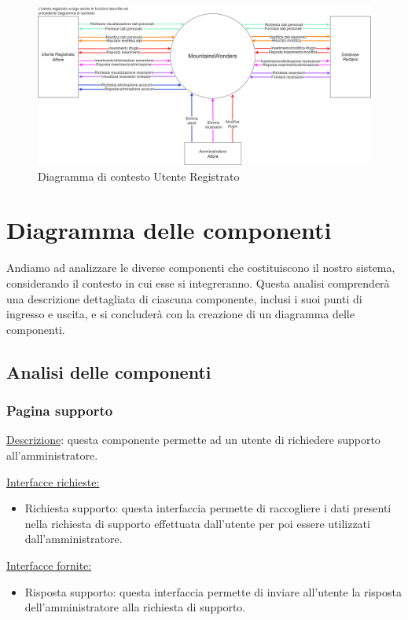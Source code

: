 \documentclass[a4paper,12pt]{article}
\begin{document}
\begin{figure}[H]
   \centering   \includegraphics[width=1.0\textwidth]{img-D2/contesto_registrato.png}
    \caption{Diagramma di contesto Utente Registrato}
\end{figure}
\newpage
\section{Diagramma delle componenti}
Andiamo ad analizzare le diverse componenti che costituiscono il nostro sistema, considerando il contesto in cui esse si integreranno. Questa analisi comprenderà una descrizione dettagliata di ciascuna componente, inclusi i suoi punti di ingresso e uscita, e si concluderà con la creazione di un diagramma delle componenti.


\subsection{Analisi delle componenti}

\subsubsection{Pagina supporto}
\underline{Descrizione}: questa componente permette ad un utente di richiedere supporto all'amministratore.

\underline{Interfacce richieste:}
\begin{itemize}
\item Richiesta supporto: questa interfaccia permette di raccogliere i dati presenti nella richiesta di supporto effettuata dall'utente per poi essere utilizzati dall'amministratore.
\end{itemize}

\underline{Interfacce fornite:}
\begin{itemize}
\item Risposta supporto: questa interfaccia permette di inviare all'utente la risposta dell'amministratore alla richiesta di supporto.
\end{itemize}
\end{document}
